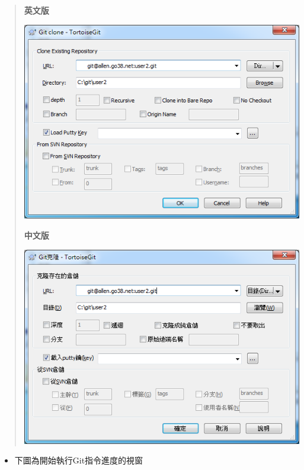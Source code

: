 \documentclass[letterpaper,10pt,english]{sphinxmanual}
\begin{document}
\begin{quote}

\textbf{英文版}

\includegraphics{tortoisegit-clone-002.png}

\textbf{中文版}

\includegraphics{tortoisegit-clone-003.png}
\end{quote}
\begin{itemize}
\item {} 
下圖為開始執行Git指令進度的視窗

\end{itemize}
\end{document}
